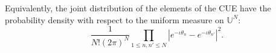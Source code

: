 \documentclass[twoside,11pt]{book}
\newtheorem{theorem}{Theorem}
\numberwithin{theorem}{chapter}
\numberwithin{definition}{chapter}
\numberwithin{proposition}{chapter}
\numberwithin{corollary}{chapter}
\numberwithin{example}{chapter}
\numberwithin{lemma}{chapter}
\DeclareMathOperator{\Tr}{Tr}
\begin{document}
Equivalently, the joint distribution of the elements of the CUE have the probability density with respect to the uniform measure on $\mathbb{U}^{N}$:
\begin{equation}\label{eq:haar_eigenvalues_density}
 \frac{1}{N!(2\pi)^{N}} \prod\limits_{1 \leq n,n' \leq N} |e^{-\iota \theta_{n}} - e^{-\iota \theta_{n'}}|^{2}.
\end{equation}








\end{document}
